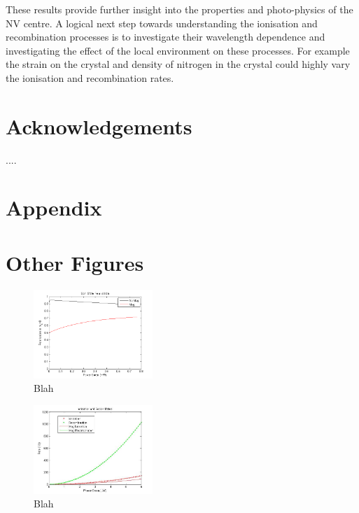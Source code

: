 \documentclass[prl]{revtex4}
\begin{document}
These results provide further insight into the properties and photo-physics of the NV centre. A logical next step towards understanding the ionisation and recombination processes is to investigate their wavelength dependence and investigating the effect of the local environment on these processes. For example the strain on the crystal and density of nitrogen in the crystal could highly vary the ionisation and recombination rates.


\section*{Acknowledgements}
....







%
\appendix
\section{Appendix}

\section{Other Figures}

\begin{figure}[H]
  \centering
  \includegraphics[width=0.4\textwidth]{SpinData.png} 
 \caption{Blah} 
\end{figure}

\begin{figure}[H]
  \centering
  \includegraphics[width=0.4\textwidth]{IonAndRecom.jpg} 
 \caption{Blah} 
\end{figure}
\end{document}
